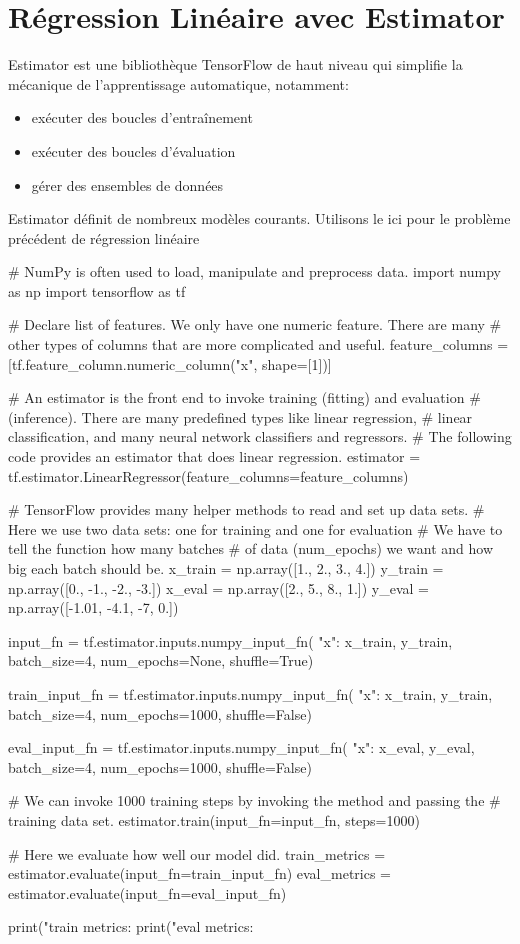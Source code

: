 \section{Régression Linéaire avec Estimator}

Estimator est une bibliothèque TensorFlow de haut niveau qui simplifie la mécanique de l'apprentissage automatique, notamment:
\begin{itemize}
\item exécuter des boucles d'entraînement
\item exécuter des boucles d'évaluation
\item gérer des ensembles de données
\end{itemize}

Estimator définit de nombreux modèles courants.
Utilisons le ici pour le problème précédent de régression linéaire
\begin{mypython}
# NumPy is often used to load, manipulate and preprocess data.
import numpy as np
import tensorflow as tf

# Declare list of features. We only have one numeric feature. There are many
# other types of columns that are more complicated and useful.
feature_columns = [tf.feature_column.numeric_column("x", shape=[1])]

# An estimator is the front end to invoke training (fitting) and evaluation
# (inference). There are many predefined types like linear regression,
# linear classification, and many neural network classifiers and regressors.
# The following code provides an estimator that does linear regression.
estimator = tf.estimator.LinearRegressor(feature_columns=feature_columns)

# TensorFlow provides many helper methods to read and set up data sets.
# Here we use two data sets: one for training and one for evaluation
# We have to tell the function how many batches
# of data (num_epochs) we want and how big each batch should be.
x_train = np.array([1., 2., 3., 4.])
y_train = np.array([0., -1., -2., -3.])
x_eval = np.array([2., 5., 8., 1.])
y_eval = np.array([-1.01, -4.1, -7, 0.])

input_fn = tf.estimator.inputs.numpy_input_fn(
    {"x": x_train}, y_train, batch_size=4, num_epochs=None, shuffle=True)

train_input_fn = tf.estimator.inputs.numpy_input_fn(
    {"x": x_train}, y_train, batch_size=4, num_epochs=1000, shuffle=False)

eval_input_fn = tf.estimator.inputs.numpy_input_fn(
    {"x": x_eval}, y_eval, batch_size=4, num_epochs=1000, shuffle=False)

# We can invoke 1000 training steps by invoking the  method and passing the
# training data set.
estimator.train(input_fn=input_fn, steps=1000)

# Here we evaluate how well our model did.
train_metrics = estimator.evaluate(input_fn=train_input_fn)
eval_metrics = estimator.evaluate(input_fn=eval_input_fn)

print("train metrics: %
print("eval metrics: %
\end{mypython}

